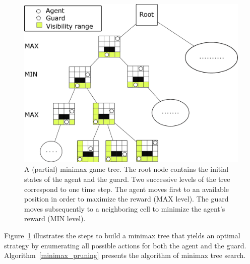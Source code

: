 \documentclass[10 pt, conference]{ieeeconf}
\begin{document}
\begin{figure}
\centering
\includegraphics[width=0.65\columnwidth]{figs/Game_tree.eps}
\caption{A (partial) minimax game tree. The root node contains the initial states of the agent and the guard. Two successive levels of the tree correspond to one time step. The agent moves first to an available position in order to maximize the reward (MAX level). The guard moves subsequently to a neighboring cell to minimize the agent's reward (MIN level).}
\label{tree}
\end{figure}

Figure~\ref{tree} illustrates the steps to build a minimax tree that yields an optimal strategy by enumerating all possible actions for both the agent and the guard. Algorithm~\ref{minimax_pruning} presents the algorithm of minimax tree search.
\end{document}

